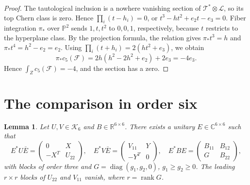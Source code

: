 \documentclass[11pt,letterpaper]{article}
\newtheorem{lemma}[theorem]{Lemma}
\newcommand{\R}{\mathbb R}
\newcommand{\C}{\mathbb C}
\newcommand{\Skew}{\mathcal K}
\newcommand{\diag}{\operatorname{diag}}
\newcommand{\rank}{\operatorname{rank}}
\begin{document}
\begin{proof}
The tautological inclusion is a nowhere vanishing section of
\(\mathcal T^*\otimes\mathcal L\), so its top Chern class is zero.
Hence \(\prod_i(t-h_i)=0\), or \(t^3-ht^2+e_2t-e_3=0\).
Fiber integration \(\pi_*\) over \(\mathbb P^2\) sends
\(1,t,t^2\) to \(0,0,1\), respectively, because \(t\) restricts to
the hyperplane class. By the projection formula, the relation gives
\(\pi_*t^3=h\) and \(\pi_*t^4=h^2-e_2=e_2\). Using
\(\prod_i(t+h_i)=2(ht^2+e_3)\), we obtain
\[
\pi_*c_5(\mathcal F)
 =2h(h^2-2h^2+e_2)+2e_3
 =-4e_3.
\]
Hence \(\int_Z c_5(\mathcal F)=-4\), and the section has a zero.
\end{proof}

\section{The comparison in order six}\label{sec:order-six}

\begin{lemma}\label{lem:unitary}
Let \(U,V\in\Skew_6\) and \(B\in\R^{6\times6}\). There exists
a unitary \(E\in\C^{6\times6}\) such that
\begin{equation}\label{eq:unitary-blocks}
E^*U\bar E=\begin{pmatrix}0&X\\-X^T&U_{22}\end{pmatrix},\quad
E^*V\bar E=\begin{pmatrix}V_{11}&Y\\-Y^T&0\end{pmatrix},\quad
E^*BE=\begin{pmatrix}B_{11}&B_{12}\\G&B_{22}\end{pmatrix},
\end{equation}
with blocks of order three and \(G=\diag(g_1,g_2,0)\),
\(g_1\ge g_2\ge0\). The leading \(r\times r\) blocks of
\(U_{22}\) and \(V_{11}\) vanish, where \(r=\rank G\).
\end{lemma}
\end{document}
